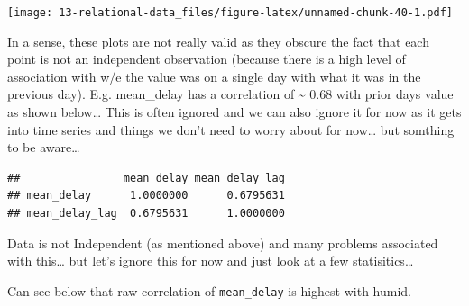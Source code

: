 \documentclass[]{book}
\newenvironment{Shaded}{\begin{snugshade}}{\end{snugshade}}
\newcommand{\DataTypeTok}[1]{\textcolor[rgb]{0.13,0.29,0.53}{#1}}
\newcommand{\KeywordTok}[1]{\textcolor[rgb]{0.13,0.29,0.53}{\textbf{#1}}}
\newcommand{\NormalTok}[1]{#1}
\newcommand{\OperatorTok}[1]{\textcolor[rgb]{0.81,0.36,0.00}{\textbf{#1}}}
\newcommand{\StringTok}[1]{\textcolor[rgb]{0.31,0.60,0.02}{#1}}
\theoremstyle{definition}
\theoremstyle{definition}
\theoremstyle{definition}
\theoremstyle{remark}
\begin{document}
\texttt{[image: 13-relational-data\_files/figure-latex/unnamed-chunk-40-1.pdf]}

In a sense, these plots are not really valid as they obscure the fact
that each point is not an independent observation (because there is a
high level of association with w/e the value was on a single day with
what it was in the previous day). E.g. mean\_delay has a correlation of
\textasciitilde{} 0.68 with prior days value as shown below\ldots{} This
is often ignored and we can also ignore it for now as it gets into time
series and things we don't need to worry about for now\ldots{} but
somthing to be aware\ldots{}

\begin{Shaded}
\end{Shaded}

\begin{verbatim}
##                mean_delay mean_delay_lag
## mean_delay      1.0000000      0.6795631
## mean_delay_lag  0.6795631      1.0000000
\end{verbatim}

Data is not Independent (as mentioned above) and many problems
associated with this\ldots{} but let's ignore this for now and just look
at a few statisitics\ldots{}

Can see below that raw correlation of \texttt{mean\_delay} is highest
with humid.

\begin{Shaded}
\end{Shaded}
\end{document}
